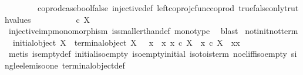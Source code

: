 \begin{isabellebody}
\ \ \ \ \ \ \ \ coprod{\isacharunderscore}{\kern0pt}case{\isacharunderscore}{\kern0pt}bool{\isacharunderscore}{\kern0pt}false\ injective{\isacharunderscore}{\kern0pt}def{}\ left{\isacharunderscore}{\kern0pt}coproj{\isacharunderscore}{\kern0pt}cfunc{\isacharunderscore}{\kern0pt}coprod\ true{\isacharunderscore}{\kern0pt}false{\isacharunderscore}{\kern0pt}only{\isacharunderscore}{\kern0pt}truth{\isacharunderscore}{\kern0pt}values{\isacharparenright}{\kern0pt}\ \ \ \ \isanewline
\ \ \isamarkupfalse%
\ \isamarkupfalse%
\ {\isachardoublequoteopen}{\isasymOmega}\ {\isasymle}\isactrlsub c\ X{\isachardoublequoteclose}\isanewline
\ \ \ \ \isamarkupfalse%
\ injective{\isacharunderscore}{\kern0pt}imp{\isacharunderscore}{\kern0pt}monomorphism\ is{\isacharunderscore}{\kern0pt}smaller{\isacharunderscore}{\kern0pt}than{\isacharunderscore}{\kern0pt}def\ mono{\isacharunderscore}{\kern0pt}type\ \isamarkupfalse%
\ blast\isanewline
{}\isamarkupfalse%
%
\endisatagproof
{\isafoldproof}%
%
\isadelimproof
\isanewline
%
\endisadelimproof
\isanewline
{}\isamarkupfalse%
\ not{\isacharunderscore}{\kern0pt}init{\isacharunderscore}{\kern0pt}not{\isacharunderscore}{\kern0pt}term{\isacharcolon}{\kern0pt}\isanewline
\ \ {\isachardoublequoteopen}{\isacharparenleft}{\kern0pt}{\isasymnot}{\isacharparenleft}{\kern0pt}initial{\isacharunderscore}{\kern0pt}object\ X{\isacharparenright}{\kern0pt}\ {\isasymand}\ {\isasymnot}{\isacharparenleft}{\kern0pt}terminal{\isacharunderscore}{\kern0pt}object\ X{\isacharparenright}{\kern0pt}{\isacharparenright}{\kern0pt}\ {\isacharequal}{\kern0pt}\ {\isacharparenleft}{\kern0pt}{\isasymexists}\ x{}{\isachardot}{\kern0pt}\ {\isacharparenleft}{\kern0pt}{\isasymexists}\ x{}{\isachardot}{\kern0pt}\ {\isacharparenleft}{\kern0pt}{\isacharparenleft}{\kern0pt}x{}\ {\isasymin}\isactrlsub c\ X{\isacharparenright}{\kern0pt}\ {\isasymand}\ {\isacharparenleft}{\kern0pt}x{}\ {\isasymin}\isactrlsub c\ X{\isacharparenright}{\kern0pt}\ {\isasymand}\ {\isacharparenleft}{\kern0pt}x{}{\isasymnoteq}x{}{\isacharparenright}{\kern0pt}\ \ {\isacharparenright}{\kern0pt}{\isacharparenright}{\kern0pt}{\isacharparenright}{\kern0pt}{\isachardoublequoteclose}\isanewline
%
\isadelimproof
\ \ %
\endisadelimproof
%
\isatagproof
{}\isamarkupfalse%
\ {\isacharparenleft}{\kern0pt}metis\ is{\isacharunderscore}{\kern0pt}empty{\isacharunderscore}{\kern0pt}def\ initial{\isacharunderscore}{\kern0pt}iso{\isacharunderscore}{\kern0pt}empty\ iso{\isacharunderscore}{\kern0pt}empty{\isacharunderscore}{\kern0pt}initial\ iso{\isacharunderscore}{\kern0pt}to{}{\isacharunderscore}{\kern0pt}is{\isacharunderscore}{\kern0pt}term\ no{\isacharunderscore}{\kern0pt}el{\isacharunderscore}{\kern0pt}iff{\isacharunderscore}{\kern0pt}iso{\isacharunderscore}{\kern0pt}empty\ single{\isacharunderscore}{\kern0pt}elem{\isacharunderscore}{\kern0pt}iso{\isacharunderscore}{\kern0pt}one\ terminal{\isacharunderscore}{\kern0pt}object{\isacharunderscore}{\kern0pt}def{\isacharparenright}{\kern0pt}%

\end{isabellebody}
